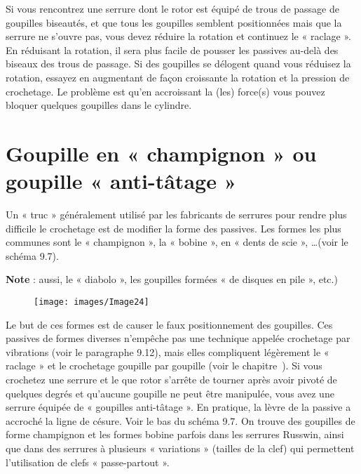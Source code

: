 \documentclass[a4paper,french,11pt,twoside]{report}
\begin{document}
Si vous rencontrez une serrure dont le rotor est équipé de trous de passage de goupilles biseautés, et que tous les goupilles semblent positionnées mais que la serrure ne s'ouvre pas, vous devez réduire la rotation et continuez le « raclage ». En réduisant la rotation, il sera plus facile de pousser les passives au-delà des biseaux des trous de passage. Si des goupilles se délogent quand vous réduisez la rotation, essayez en augmentant de façon croissante la rotation et la pression de crochetage. Le problème est qu'en accroissant la (les) force(s) vous pouvez bloquer quelques goupilles dans le cylindre.

\section{Goupille en  « champignon » ou goupille « anti-tâtage »}

Un « truc » généralement utilisé par les fabricants de serrures pour rendre plus difficile le crochetage est de modifier la forme des passives. Les formes les plus communes sont le « champignon », la « bobine », en « dents de scie », \ldots (voir le schéma 9.7).

\noindent \textbf{Note} : aussi, le « diabolo », les  goupilles formées « de disques en pile », etc.)

\begin{figure}[ht] \begin{center}
        \texttt{[image: images/Image24]}
        \caption{}
\end{center} \end{figure}

Le but de ces formes est de causer le faux positionnement des goupilles. Ces passives de formes diverses n'empêche pas une technique appelée crochetage par vibrations (voir le paragraphe 9.12), mais elles compliquent légèrement le « raclage » et le crochetage goupille par goupille (voir le chapitre~).
Si vous crochetez une serrure et le que rotor s'arrête de tourner après avoir pivoté de quelques degrés et qu'aucune goupille ne peut être manipulée, vous avez une serrure équipée de « goupilles anti-tâtage ». En pratique, la lèvre de la passive a accroché la ligne de césure. Voir le bas du schéma 9.7. On trouve des goupilles de forme champignon et les formes bobine parfois dans les serrures Russwin, ainsi que dans des serrures à plusieurs « variations » (tailles de la clef) qui permettent l'utilisation de clefs « passe-partout ».
\end{document}
